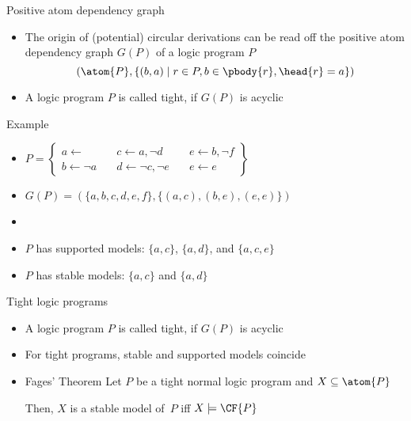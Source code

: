 \begin{frame}{Positive atom dependency graph}
  \bigskip
  \begin{itemize}
  \item<2->
    The origin of (potential) circular derivations can be read off the
    \alert{positive atom dependency graph} $G(P)$ of a logic program $P$
    \[
      (\atom{P}, \{(b,a) \mid r\in P, b \in \pbody{r}, \head{r}=a\})
    \]
    \smallskip
  \item<3-> A logic program $P$ is called \alert{tight}, if $G(P)$ is acyclic
  \end{itemize}
\end{frame}
\begin{frame}{Example}
  \bigskip
  \begin{itemize}
  \item<1-> []
    \par
    \(
    P
    =
    \left\{
      \begin{array}{lll}
        a \leftarrow                 \quad &
        c \leftarrow a, \neg d       \quad &
        e \leftarrow b, \neg f
        \\
        b \leftarrow \neg a         \quad &
        d \leftarrow \neg c, \neg e \quad &
        e \leftarrow e
      \end{array}
    \right\}
    \)
    \bigskip
  \item<2->
    \(
    G(P)= (\{a,b,c,d,e,f\},\{(a,c),(b,e),(e,e)\})
    \)
  \item<3-> []
    \begin{center}
      
    \end{center}
    \smallskip
  \item<4-> $P$ has supported models: $\{a,c\}$, $\{a,d\}$, and $\{a,c,e\}$
    \smallskip
  \item<4-> $P$ has stable    models: $\{a,c\}$ and $\{a,d\}$
  \end{itemize}
\end{frame}
\begin{frame}{Tight logic programs}
  \bigskip
  \begin{itemize}
  \item<1-> A logic program $P$ is called \alert{tight}, if $G(P)$ is acyclic
    \medskip
  \item<2-> For tight programs, stable and supported models coincide\pause[3]
    \bigskip
  \item<3->[] \par
    \begin{minipage}[t]{0.8\linewidth}
    \begin{block}{Fages' Theorem}
      Let $P$ be a tight normal logic program and $X\subseteq\atom{P}$
      \par\medskip
      Then, $X$ is a stable model of~$P$ iff $X\models\CF{P}$
    \end{block}
    \end{minipage}
  \end{itemize}
\end{frame}
